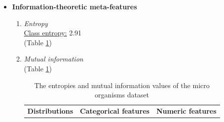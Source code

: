 \documentclass[10pt,a4paper]{report}
\begin{document}
\begin{itemize}
\begin{enumerate}
			\underline{Explained variation component 1:} 0.14 \\
			\underline{Explained variation component 2:} 0.10 \\
			\underline{Explained variation component 3:} 0.08 \\
			\underline{Eigenvalue component 1:} 112301000896299.64 \\
			\underline{Eigenvalue component 2:} 83271983089506.69 \\
			\underline{Eigenvalue component 3:} 63192806579339.62 \\
			\underline{Determinant value:} $\infty$ \\
		\end{enumerate}
		\item \textbf{Information-theoretic meta-features} \\ 
		\begin{enumerate}
			\item \textit{Entropy} \\
			\underline{Class entropy:} 2.91 \\
			(Table \ref{tab:EntropyMIMODataset})
			\item \textit{Mutual information} \\
			(Table \ref{tab:EntropyMIMODataset})
			\begin{table}[h!]
				\caption{The entropies and mutual information values of the micro organisms dataset}
				\label{tab:EntropyMIMODataset}
				\begin{tabular}{l|llllll}
					\multirow{2}{*}{\textbf{Distributions}} & \multicolumn{3}{l}{\textbf{Categorical features}}                                                                                                                                                                                    & \multicolumn{3}{l}{\textbf{Numeric features}}                                                                                                                                                                   \\ \cline{2-7} 

\end{tabular}
\end{table}
\end{enumerate}
\end{itemize}
\end{document}
